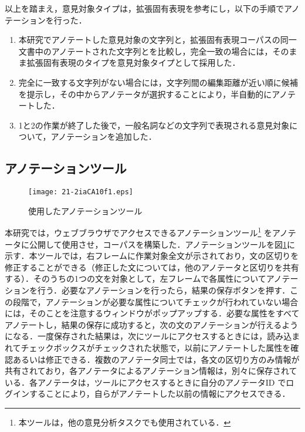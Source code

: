 \documentclass[japanese]{jnlp_1.4}
\begin{document}
以上を踏まえ，意見対象タイプは，拡張固有表現を参考にし，以下の手順でアノテーションを行った．

\begin{enumerate}
\item 本研究でアノテートした意見対象の文字列と，拡張固有表現コーパスの同一文書中のアノテートされた文字列とを比較し，完全一致の場合には，そのまま拡張固有表現のタイプを意見対象タイプとして採用した．
\item 完全に一致する文字列がない場合には，文字列間の編集距離が近い順に候補を提示し，その中からアノテータが選択することにより，半自動的にアノテートした．
\item 1と2の作業が終了した後で，一般名詞などの文字列で表現される意見対象について，アノテーションを追加した．
\end{enumerate}


\subsection{アノテーションツール}
\label{subsec:annotationtool}

\begin{figure}[b]
\begin{center}
\texttt{[image: 21-2iaCA10f1.eps]}
\end{center}
\caption{使用したアノテーションツール}
\label{fig:annotationtool}
\end{figure}

本研究では，ウェブブラウザでアクセスできるアノテーションツール\footnote{本ツールは，他の意見分析タスク\cite{seki2010ntcirov}でも使用されている．} をアノテータに公開して使用させ，コーパスを構築した．アノテーションツールを図\ref{fig:annotationtool}に示す．本ツールでは，右フレームに作業対象全文が示されており，文の区切りを修正することができる（修正した文については，他のアノテータと区切りを共有する）．そのうちの1つの文を対象として，左フレームで各属性についてアノテーションを行う．必要なアノテーションを行ったら，結果の保存ボタンを押す．この段階で，アノテーションが必要な属性についてチェックが行われていない場合には，そのことを注意するウィンドウがポップアップする．必要な属性をすべてアノテートし，結果の保存に成功すると，次の文のアノテーションが行えるようになる．一度保存された結果は，次にツールにアクセスするときには，読み込まれてチェックボックスがチェックされた状態で，以前にアノテートした属性を確認あるいは修正できる．複数のアノテータ同士では，各文の区切り方のみ情報が共有されており，各アノテータによるアノテーション情報は，別々に保存されている．各アノテータは，ツールにアクセスするときに自分のアノテータID でログインすることにより，自らがアノテートした以前の情報にアクセスできる．
\end{document}

